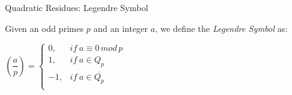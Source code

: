 \documentclass{beamer}
\begin{document}

\begin{frame}{Quadratic Residues: Legendre Symbol}
\begin{definition}
	Given an odd primes $p$ and an integer $a$, we define the \textit{Legendre Symbol} as:
	
	\begin{center}
		$
		\left( \dfrac{a}{p} \right) =
		\begin{cases}
		0, & if\ a \equiv 0 \, mod \, p\\
		1, & if\ a \in Q_p  \\
		-1, & if\ a \in \overline{Q_p} \\
		\end{cases}
		$
	\end{center}
\end{definition}
\end{frame}


%		
\end{document}
